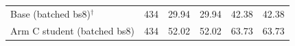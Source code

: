 \begin{table}[t]
{\begin{tabular}{lrrrrr}
Base (batched bs8)$^{\dagger}$ & 434 & 29.94 & 29.94 & 42.38 & 42.38 \\
Arm C student (batched bs8) & 434 & 52.02 & 52.02 & 63.73 & 63.73 \\
\bottomrule
\end{tabular}%
}
\end{table}
